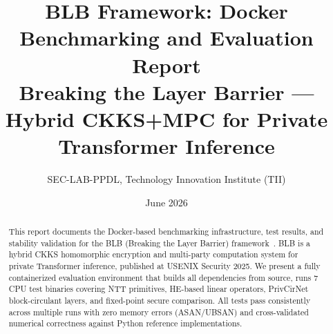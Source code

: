 \documentclass[11pt,a4paper]{article}
\title{BLB Framework: Docker Benchmarking and Evaluation Report\\[0.5em]
\large Breaking the Layer Barrier --- Hybrid CKKS+MPC for Private Transformer Inference}
\author{SEC-LAB-PPDL, Technology Innovation Institute (TII)}
\date{June 2026}
\begin{document}
\maketitle

\begin{abstract}
This report documents the Docker-based benchmarking infrastructure, test results, and stability validation for the BLB (Breaking the Layer Barrier) framework~\cite{xu2025breaking}.
BLB is a hybrid CKKS homomorphic encryption and multi-party computation system for private Transformer inference, published at USENIX Security 2025.
We present a fully containerized evaluation environment that builds all dependencies from source, runs 7 CPU test binaries covering NTT primitives, HE-based linear operators, PrivCirNet block-circulant layers, and fixed-point secure comparison.
All tests pass consistently across multiple runs with zero memory errors (ASAN/UBSAN) and cross-validated numerical correctness against Python reference implementations.
\end{abstract}

\tableofcontents
\newpage











\end{document}
